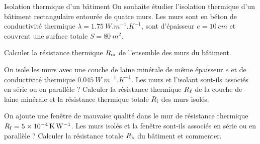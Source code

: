 \begin{exo}[PC][1][TD]{Isolation thermique d'un bâtiment}
  On souhaite étudier l'isolation thermique d'un bâtiment rectangulaire entourée de quatre murs. Les murs sont en béton de conductivité thermique $\lambda = \SI{1.75}{W.m^{-1}.K^{-1}}$, sont d'épaisseur $e=\SI{10}{cm}$ et couvrent une surface totale $S=\SI{80}{m^2}$.
   \begin{quest}
     \item  Calculer la résistance thermique $R_{\rm m}$ de l'ensemble des murs du bâtiment.
     \item On isole les murs avec une couche de laine minérale de même épaisseur $e$ et de conductivité thermique $\SI{0.045}{W.m^{-1}.K^{-1}}$. Les murs et l'isolant sont-ils associés en série ou en parallèle ? Calculer la résistance thermique $R_{\rm \ell}$ de la couche de laine minérale et la résistance thermique totale $R_{\rm i}$ des murs isolés.
     \item On ajoute une fenêtre de mauvaise qualité dans le mur de résistance thermique $R_{\rm f} = \SI{5e-4}{K.W^{-1}}$. Les murs isolés et la fenêtre sont-ils associés en série ou en parallèle ? Calculer la résistance totale $R_{\rm b}$ du bâtiment et commenter.
   \end{quest}
\end{exo}

